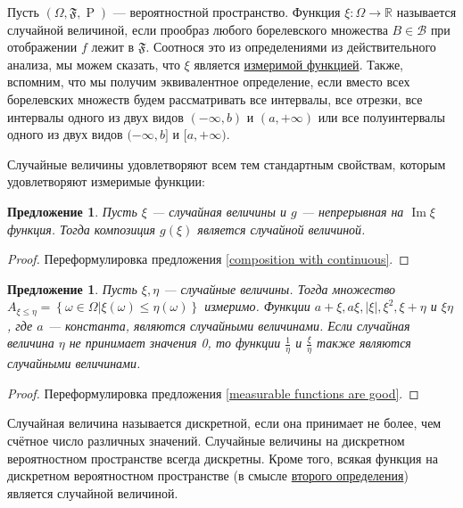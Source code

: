 \documentclass[12pt]{article}
\newtheorem{proposition}[theorem]{Предложение}
\numberwithin{theorem}{section}
\theoremstyle{definition}
\newcommand{\defin}[2]{\hypertarget{#2}{{\color{red} #1}}}
\newcommand{\RR}{\mathbb{R}}
\newcommand{\calB}{\mathcal{B}}
\newcommand{\prob}{\operatorname{P}}
\newcommand{\events}{\mathfrak{F}}
\newcommand{\Image}{\operatorname{Im}}
\newcommand{\defineset}[2]{\left\{
	\left.
	#1
	\right\vert
	#2
	\right\}}
\begin{document}
	Пусть $ (\Omega, \events, \prob) $ --- вероятностной пространство.
	Функция $ \xi \colon \Omega \to \RR $ называется \defin{случайной величиной}{random-variable},
	если прообраз любого борелевского множества $ B \in \calB $ при отображении $ f $
	лежит в $ \events $. Соотнося это из определениями из действительного анализа, 
	мы можем сказать, что $ \xi $ является \hyperlink{measurable-function}{измеримой функцией}.
	Также, вспомним, что мы получим эквивалентное определение,
	если вместо всех борелевских множеств будем рассматривать все интервалы, все отрезки,
	все интервалы одного из двух видов $ (-\infty, b) $ и $ (a, +\infty) $
	или все полуинтервалы одного из двух видов $ (-\infty, b] $ и $ [a, +\infty) $.
	
	Случайные величины удовлетворяют всем тем стандартным свойствам, 
	которым удовлетворяют измеримые функции:
	
	\begin{proposition} \label{random variebles composition with continuous}
		Пусть $ \xi $ --- случайная величины и $ g $ --- непрерывная на $ \Image \xi $ функция.
		Тогда композиция $ g(\xi) $ является случайной величиной.
	\end{proposition}
	
	\begin{proof}
		Переформулировка предложения \ref{composition with continuous}.
	\end{proof}
	
	\begin{proposition} \label{random variables are good}
		Пусть $ \xi, \eta $ --- случайные величины.
		Тогда множество $ A_{\xi \leqslant \eta} = \defineset{\omega \in \Omega}{\xi(\omega) \leqslant \eta(\omega)} $
		измеримо.
		Функции $ a + \xi, a\xi, |\xi|, \xi^2, \xi + \eta $ и $ \xi\eta $, где $ a $ --- константа, являются случайными величинами.
		Если случайная величина $ \eta $ не принимает значения 0, то функции $ \tfrac{1}{\eta} $ и $ \tfrac{\xi}{\eta} $
		также являются случайными величинами.
	\end{proposition}
	
	\begin{proof}
		Переформулировка предложения \ref{measurable functions are good}.
	\end{proof}
	
	Случайная величина называется \defin{дискретной}{discrete-random-variable}, 
	если она принимает не более, чем счётное число различных значений.
	Случайные величины на дискретном вероятностном пространстве всегда дискретны.
	Кроме того, всякая функция на дискретном вероятностном пространстве (в смысле \hyperlink{discr-2}{второго определения})
	является случайной величиной.
	
\end{document}
